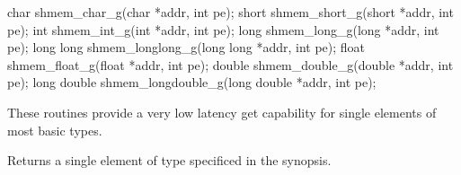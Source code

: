 
\synC   %

 char shmem_char_g(char *addr, int pe);
 short shmem_short_g(short *addr, int pe);
 int shmem_int_g(int *addr, int pe);
 long shmem_long_g(long *addr, int pe);
 long long  shmem_longlong_g(long long *addr, int pe);
 float shmem_float_g(float *addr, int pe);
 double shmem_double_g(double *addr, int pe);
 long double shmem_longdouble_g(long double *addr, int pe);

\synF   %


{
  These  routines	provide	 a  very low latency get capability for single elements of most basic types. 
}

{

      {Returns a single element of type specificed in the synopsis.}
}


{
}

\eAPI

       
       
       
       





